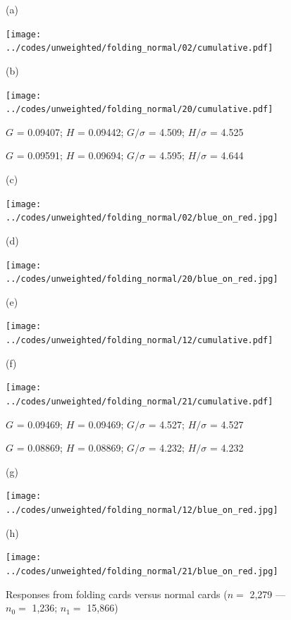 \documentclass{article}
\newlength{\vertsep}
\newlength{\imsize}
\newlength{\imsized}
\begin{document}
\begin{figure}
\begin{centering}

(a) \parbox{\imsize}{\texttt{[image: ../codes/unweighted/folding\_normal/02/cumulative.pdf]}}
\quad\quad
(b) \parbox{\imsize}{\texttt{[image: ../codes/unweighted/folding\_normal/20/cumulative.pdf]}}

\parbox{\imsized}{\hfil \footnotesize $G$ = 0.09407; $H$ = 0.09442;
$G/\sigma$ = 4.509; $H/\sigma$ = 4.525}
\parbox{\imsized}{\hfil \footnotesize $G$ = 0.09591; $H$ = 0.09694;
$G/\sigma$ = 4.595; $H/\sigma$ = 4.644}

\vspace{\vertsep}

(c) \parbox{\imsize}{\texttt{[image: ../codes/unweighted/folding\_normal/02/blue\_on\_red.jpg]}}
\quad\quad
(d) \parbox{\imsize}{\texttt{[image: ../codes/unweighted/folding\_normal/20/blue\_on\_red.jpg]}}

\vspace{\vertsep}

(e) \parbox{\imsize}{\texttt{[image: ../codes/unweighted/folding\_normal/12/cumulative.pdf]}}
\quad\quad
(f) \parbox{\imsize}{\texttt{[image: ../codes/unweighted/folding\_normal/21/cumulative.pdf]}}

\parbox{\imsized}{\hfil \footnotesize $G$ = 0.09469; $H$ = 0.09469;
$G/\sigma$ = 4.527; $H/\sigma$ = 4.527}
\parbox{\imsized}{\hfil \footnotesize $G$ = 0.08869; $H$ = 0.08869;
$G/\sigma$ = 4.232; $H/\sigma$ = 4.232}

\vspace{\vertsep}

(g) \parbox{\imsize}{\texttt{[image: ../codes/unweighted/folding\_normal/12/blue\_on\_red.jpg]}}
\quad\quad
(h) \parbox{\imsize}{\texttt{[image: ../codes/unweighted/folding\_normal/21/blue\_on\_red.jpg]}}

\end{centering}
\caption{Responses from folding cards versus normal cards
($n =$ 2,279 --- $n_0 =$ 1,236; $n_1 =$ 15,866)}
\label{folding_normal}
\end{figure}
\end{document}
